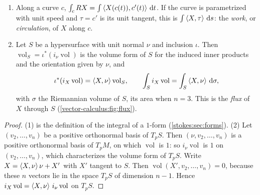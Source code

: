 \begin{notechapter}
\begin{proposition}
\label{vector-calculus:prop:integrals}
\begin{enumerate}[nosep]
  \item Along a curve $c$,
        $\int_cRX = \int\left\langle X(c(t)), c'(t) \right\rangle\,\mathrm{d} t$. If the curve is
        parametrized with unit speed and $\tau = c'$ is its unit
        tangent, this is $\int\left\langle X, \tau \right\rangle\,\mathrm{d} s$: the \emph{work},
        or \emph{circulation}, of $X$ along $c$.
  \item Let $S$ be a hypersurface with unit normal $\nu$ and inclusion
        $\iota$. Then $\operatorname{vol}_S
        = \iota^*(i_\nu\operatorname{vol})$ is the volume form of $S$
        for the induced inner products and the orientation given by
        $\nu$, and
        \[
          \iota^*(i_X\operatorname{vol})
          = \left\langle X, \nu \right\rangle\operatorname{vol}_S ,
          \qquad
          \int_Si_X\operatorname{vol}
          = \int_S\left\langle X, \nu \right\rangle\,\mathrm{d}\sigma ,
        \]
        with $\sigma$ the Riemannian volume of $S$, its area when
        $n = 3$. This is the \emph{flux} of $X$ through $S$
        (\cref{vector-calculus:fig:flux}).
\end{enumerate}
\end{proposition}

\begin{proof}
(1) is the definition of the integral of a $1$-form
(\cref{stokes:sec:forms}). (2) Let $(v_2,\dots,v_n)$ be a positive
orthonormal basis of $T_pS$. Then $(\nu, v_2,\dots,v_n)$ is a positive
orthonormal basis of $T_pM$, on which $\operatorname{vol}$ is $1$: so
$i_\nu\operatorname{vol}$ is $1$ on $(v_2,\dots,v_n)$, which
characterizes the volume form of $T_pS$. Write
$X = \left\langle X, \nu \right\rangle\nu + X'$ with $X'$ tangent to $S$. Then
$\operatorname{vol}(X', v_2,\dots,v_n) = 0$, because these $n$ vectors
lie in the space $T_pS$ of dimension $n - 1$. Hence
$i_X\operatorname{vol} = \left\langle X, \nu \right\rangle\,i_\nu\operatorname{vol}$ on
$T_pS$.
\end{proof}


\end{notechapter}
